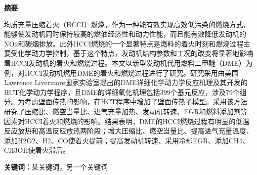 \setlength{\parindent}{2em}

\begin{CJK}{UTF8}{gbsn}
	\begin{abstractZh}
		
		\begin{center}
			\textbf{\Large 摘要}
		\end{center}
		\vspace{1cm}
		
		均质充量压缩着火（HCCI）燃烧，作为一种能有效实现高效低污染的燃烧方式，能够使发动机同时保持较高的燃油经济性和动力性能，而且能有效降低发动机的NOx和碳烟排放。此外HCCI燃烧的一个显著特点是燃料的着火时刻和燃烧过程主要受化学动力学控制，基于这个特点，发动机结构参数和工况的改变将显著地影响着HCCI发动机的着火和燃烧过程。本文以新型发动机代用燃料二甲醚（DME）为例，对HCCI发动机燃用DME的着火和燃烧过程进行了研究。研究采用由美国Lawrence Livermore国家实验室提出的DME详细化学动力学反应机理及其开发的HCT化学动力学程序，且DME的详细氧化机理包括399个基元反应，涉及79个组分。为考虑壁面传热的影响，在HCT程序中增加了壁面传热子模型。采用该方法研究了压缩比、燃空当量比、进气充量加热、发动机转速、EGR和燃料添加剂等因素对HCCI着火和燃烧的影响。结果表明，DME的HCCI燃烧过程有明显的低温反应放热和高温反应放热两阶段；增大压缩比、燃空当量比、提高进气充量温度、添加H2O2、H2、CO使着火提前；提高发动机转速、采用冷却EGR、添加CH4、CH3OH使着火滞后。
	\end{abstractZh}
	
	\begin{keywordsZh}
		\textbf{关键词：}某关键词，另一个关键词
	\end{keywordsZh}
	
\end{CJK}

\setlength{\parindent}{0em}
